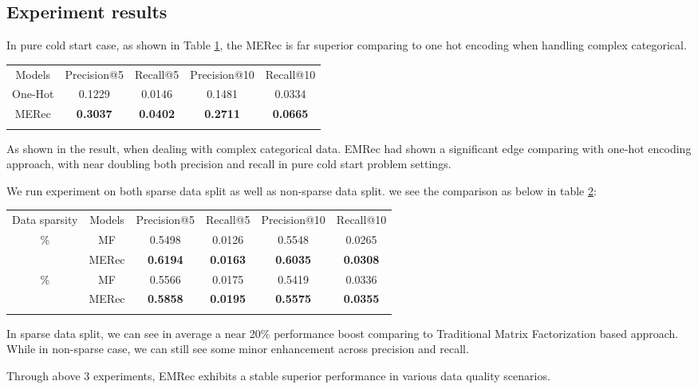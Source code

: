 \subsection{Experiment results}
In pure cold start case, as shown in Table \ref{tbl1}, the MERec is far superior comparing to one hot encoding when handling complex categorical.

\begin{table}
    {\begin{tabular}{@{}ccccc@{}}\toprule
    Models & Precision@5 & Recall@5 & Precision@10 & Recall@10 \\
    \colrule
    One-Hot\hphantom{00} & \hphantom{0} 0.1229 & \hphantom{0} 0.0146 & 0.1481 & 0.0334 \\
    MERec\hphantom{00} & \hphantom{0} \textbf{0.3037} & \hphantom{0} \textbf{0.0402} & \textbf{0.2711} & \textbf{0.0665} \\
    
    \botrule
    \end{tabular}
    }\label{tbl1}
    \end{table}
As shown in the result, when dealing with complex categorical data. EMRec had shown a significant edge comparing with one-hot encoding approach, with near doubling both precision and recall in pure cold start problem settings.

We run experiment on both sparse data split as well as non-sparse data split. we see the comparison as below in table \ref{tbl2}: 
\begin{table}
    {\begin{tabular}{@{}cccccc@{}}\toprule
    Data sparsity &Models & Precision@5 & Recall@5 & Precision@10 & Recall@10 \\
    \colrule
    1.1\%&MF\hphantom{00} & \hphantom{0} 0.5498 & 0.0126 & 0.5548 & 0.0265 \\
    &MERec\hphantom{00} & \hphantom{0} \textbf{0.6194} & \textbf{0.0163} & \textbf{0.6035} & \textbf{0.0308} \\
    \colrule
    2.3\%&MF\hphantom{00} & 0.5566 & 0.0175 & 0.5419 & 0.0336 \\
    &MERec\hphantom{00} & \hphantom{0} \textbf{0.5858} & \textbf{0.0195} & \textbf{0.5575} & \textbf{0.0355} \\
    \botrule
    \end{tabular}
    }
    \label{tbl2}
\end{table}
In sparse data split, we can see in average a near 20\% performance boost comparing to Traditional Matrix Factorization based approach. 
While in non-sparse case, we can still see some minor enhancement across precision and recall.

Through above 3 experiments, EMRec exhibits a stable superior performance in various data quality scenarios.

